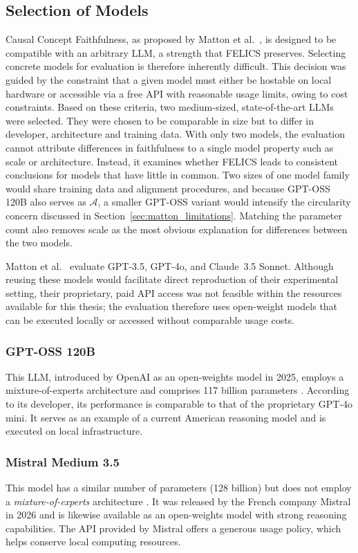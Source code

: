 \subsection{Selection of Models}
\label{sec:selection_models}
Causal Concept Faithfulness, as proposed by Matton et al.~\cite{mattonWalkTalkMeasuring2024}, is designed to be compatible with an arbitrary LLM, a strength that FELICS preserves. Selecting concrete models for evaluation is therefore inherently difficult. This decision was guided by the constraint that a given model must either be hostable on local hardware or accessible via a free API with reasonable usage limits, owing to cost constraints. Based on these criteria, two medium-sized, state-of-the-art LLMs were selected. They were chosen to be comparable in size but to differ in developer, architecture and training data. With only two models, the evaluation cannot attribute differences in faithfulness to a single model property such as scale or architecture. Instead, it examines whether FELICS leads to consistent conclusions for models that have little in common. Two sizes of one model family would share training data and alignment procedures, and because GPT-OSS 120B also serves as $\mathcal{A}$, a smaller GPT-OSS variant would intensify the circularity concern discussed in Section~\ref{sec:matton_limitations}. Matching the parameter count also removes scale as the most obvious explanation for differences between the two models.

Matton et al.~\cite{mattonWalkTalkMeasuring2024} evaluate GPT-3.5, GPT-4o, and Claude~3.5 Sonnet. Although reusing these models would facilitate direct reproduction of their experimental setting, their proprietary, paid API access was not feasible within the resources available for this thesis; the evaluation therefore uses open-weight models that can be executed locally or accessed without comparable usage costs.

\subsubsection{GPT-OSS 120B}
This LLM, introduced by OpenAI as an open-weights model in 2025, employs a mixture-of-experts architecture and comprises 117 billion parameters \cite{Gptoss2026}. According to its developer, its performance is comparable to that of the proprietary GPT-4o mini. It serves as an example of a current American reasoning model and is executed on local infrastructure.

\subsubsection{Mistral Medium 3.5}
This model has a similar number of parameters (128 billion) but does not employ a \emph{mixture-of-experts} architecture \cite{MistralMedium35}. It was released by the French company Mistral in 2026 and is likewise available as an open-weights model with strong reasoning capabilities. The API provided by Mistral offers a generous usage policy, which helps conserve local computing resources.

